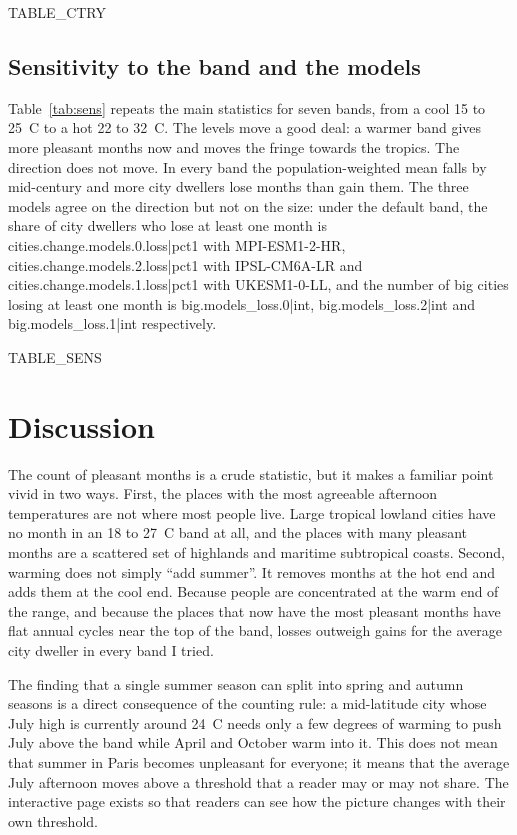 \documentclass[11pt,a4paper]{article}
\begin{document}
{{TABLE_CTRY}}

\subsection{Sensitivity to the band and the models}\label{sec:sens}

Table~\ref{tab:sens} repeats the main statistics for seven bands, from a cool 15 to 25~\textdegree C to a hot 22 to 32~\textdegree C. The levels move a good deal: a warmer band gives more pleasant months now and moves the fringe towards the tropics. The direction does not move. In every band the population-weighted mean falls by mid-century and more city dwellers lose months than gain them. The three models agree on the direction but not on the size: under the default band, the share of city dwellers who lose at least one month is {{cities.change.models.0.loss|pct1}} with MPI-ESM1-2-HR, {{cities.change.models.2.loss|pct1}} with IPSL-CM6A-LR and {{cities.change.models.1.loss|pct1}} with UKESM1-0-LL, and the number of big cities losing at least one month is {{big.models_loss.0|int}}, {{big.models_loss.2|int}} and {{big.models_loss.1|int}} respectively.

{{TABLE_SENS}}

\section{Discussion}

The count of pleasant months is a crude statistic, but it makes a familiar point vivid in two ways. First, the places with the most agreeable afternoon temperatures are not where most people live. Large tropical lowland cities have no month in an 18 to 27~\textdegree C band at all, and the places with many pleasant months are a scattered set of highlands and maritime subtropical coasts. Second, warming does not simply ``add summer''. It removes months at the hot end and adds them at the cool end. Because people are concentrated at the warm end of the range, and because the places that now have the most pleasant months have flat annual cycles near the top of the band, losses outweigh gains for the average city dweller in every band I tried.

The finding that a single summer season can split into spring and autumn seasons is a direct consequence of the counting rule: a mid-latitude city whose July high is currently around 24~\textdegree C needs only a few degrees of warming to push July above the band while April and October warm into it. This does not mean that summer in Paris becomes unpleasant for everyone; it means that the average July afternoon moves above a threshold that a reader may or may not share. The interactive page exists so that readers can see how the picture changes with their own threshold.
\end{document}
